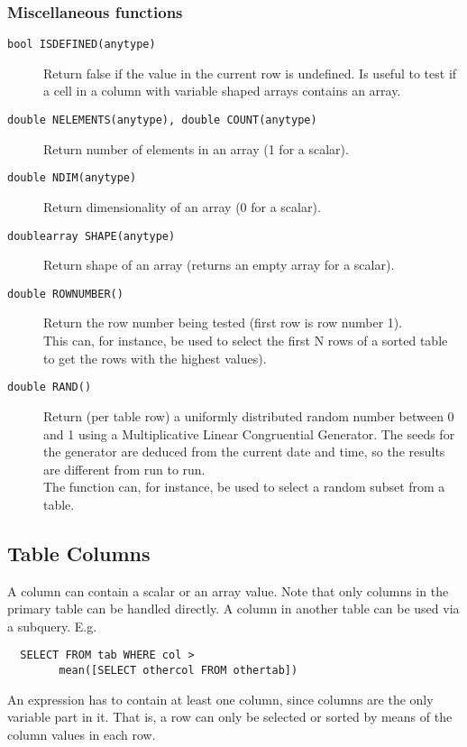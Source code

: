 \subsubsection{Miscellaneous functions}
\begin{description}
  \item[ \texttt{bool ISDEFINED(anytype)}]
    Return false if the value in the current row is undefined. Is
    useful to test if a cell in a column with variable shaped arrays
    contains an array.
  \item[ \texttt{double NELEMENTS(anytype), double COUNT(anytype)}]
    Return number of elements in an array (1 for a scalar).
  \item[ \texttt{double NDIM(anytype)}]
    Return dimensionality of an array (0 for a scalar).
  \item[ \texttt{doublearray SHAPE(anytype)}]
    Return shape of an array (returns an empty array for a scalar).
  \item[ \texttt{double ROWNUMBER()}]
       Return the row number being tested (first row is row number 1).
       \\This can, for instance, be used to select the first N rows
       of a sorted table to get the rows with the highest values).
  \item[ \texttt{double RAND()}]
       Return (per table row) a uniformly distributed random number
       between 0 and 1 using a Multiplicative Linear Congruential Generator.
       The seeds for the generator are deduced from the current date and
       time, so the results are different from run to run.
       \\The function can, for instance, be used to select a random
       subset from a table.
\end{description}

\subsection{\label{TAQL:COLUMNS}Table Columns}
A column can contain a scalar or an array value.
Note that only columns in the primary table can be handled directly.
A column in another table can be used via a subquery. E.g.
\begin{verbatim}
  SELECT FROM tab WHERE col >
        mean([SELECT othercol FROM othertab])
\end{verbatim}
An expression has to contain at least one column, since columns
are the only variable part in it. That is, a row can only be selected
or sorted by means of the column values in each row.

